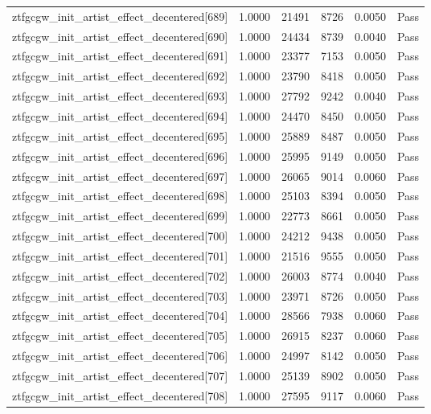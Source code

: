 \begin{table}[htbp]
\begin{tabular}{llrrll}
ztfgcgw\_init\_artist\_effect\_decentered[689] & 1.0000 & 21491 & 8726 & 0.0050 & Pass \\
ztfgcgw\_init\_artist\_effect\_decentered[690] & 1.0000 & 24434 & 8739 & 0.0040 & Pass \\
ztfgcgw\_init\_artist\_effect\_decentered[691] & 1.0000 & 23377 & 7153 & 0.0050 & Pass \\
ztfgcgw\_init\_artist\_effect\_decentered[692] & 1.0000 & 23790 & 8418 & 0.0050 & Pass \\
ztfgcgw\_init\_artist\_effect\_decentered[693] & 1.0000 & 27792 & 9242 & 0.0040 & Pass \\
ztfgcgw\_init\_artist\_effect\_decentered[694] & 1.0000 & 24470 & 8450 & 0.0050 & Pass \\
ztfgcgw\_init\_artist\_effect\_decentered[695] & 1.0000 & 25889 & 8487 & 0.0050 & Pass \\
ztfgcgw\_init\_artist\_effect\_decentered[696] & 1.0000 & 25995 & 9149 & 0.0050 & Pass \\
ztfgcgw\_init\_artist\_effect\_decentered[697] & 1.0000 & 26065 & 9014 & 0.0060 & Pass \\
ztfgcgw\_init\_artist\_effect\_decentered[698] & 1.0000 & 25103 & 8394 & 0.0050 & Pass \\
ztfgcgw\_init\_artist\_effect\_decentered[699] & 1.0000 & 22773 & 8661 & 0.0050 & Pass \\
ztfgcgw\_init\_artist\_effect\_decentered[700] & 1.0000 & 24212 & 9438 & 0.0050 & Pass \\
ztfgcgw\_init\_artist\_effect\_decentered[701] & 1.0000 & 21516 & 9555 & 0.0050 & Pass \\
ztfgcgw\_init\_artist\_effect\_decentered[702] & 1.0000 & 26003 & 8774 & 0.0040 & Pass \\
ztfgcgw\_init\_artist\_effect\_decentered[703] & 1.0000 & 23971 & 8726 & 0.0050 & Pass \\
ztfgcgw\_init\_artist\_effect\_decentered[704] & 1.0000 & 28566 & 7938 & 0.0060 & Pass \\
ztfgcgw\_init\_artist\_effect\_decentered[705] & 1.0000 & 26915 & 8237 & 0.0060 & Pass \\
ztfgcgw\_init\_artist\_effect\_decentered[706] & 1.0000 & 24997 & 8142 & 0.0050 & Pass \\
ztfgcgw\_init\_artist\_effect\_decentered[707] & 1.0000 & 25139 & 8902 & 0.0050 & Pass \\
ztfgcgw\_init\_artist\_effect\_decentered[708] & 1.0000 & 27595 & 9117 & 0.0060 & Pass \\

\end{tabular}
\end{table}
